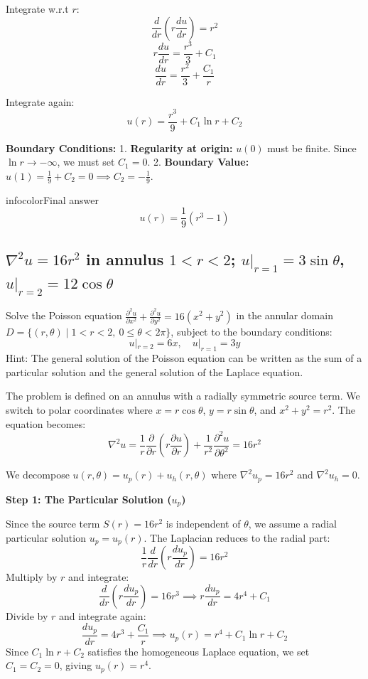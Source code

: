 \documentclass[a4paper,11pt]{article} %
\newenvironment{summarybox}[1][]{\begin{custombox}[#1]{infocolor}{Final answer}}{\end{custombox}}
\begin{document}
Integrate w.r.t $r$:
$$ \frac{d}{dr}\left(r \frac{du}{dr}\right) = r^2 $$
$$ r \frac{du}{dr} = \frac{r^3}{3} + C_1 $$
$$ \frac{du}{dr} = \frac{r^2}{3} + \frac{C_1}{r} $$

Integrate again:
$$ u(r) = \frac{r^3}{9} + C_1 \ln r + C_2 $$

\textbf{Boundary Conditions:}
1. \textbf{Regularity at origin:} $u(0)$ must be finite. Since $\ln r \to -\infty$, we must set $C_1 = 0$.
2. \textbf{Boundary Value:} $u(1) = \tfrac{1}{9} + C_2 = 0 \implies C_2 = -\tfrac{1}{9}$.

\begin{summarybox}
$$ u(r) = \frac{1}{9}(r^3 - 1) $$
\end{summarybox}
\newpage
\subsection{\texorpdfstring{$\nabla^2 u = 16r^2$ in annulus $1<r<2$; $u|_{r=1}=3\sin\theta$, $u|_{r=2}=12\cos\theta$}{Poisson in annulus: particular radial solution $u_p=r^4$ plus homogeneous Laplace for boundary residuals}}

\begin{problembox}
Solve the Poisson equation $\frac{\partial^2 u}{\partial x^2} + \frac{\partial^2 u}{\partial y^2} = 16(x^2 + y^2)$ in the annular domain $D = \{ (r, \theta) \mid 1 < r < 2, \ 0 \le \theta < 2\pi \}$, subject to the boundary conditions:
$$ u|_{r=2} = 6x, \quad u|_{r=1} = 3y $$
Hint: The general solution of the Poisson equation can be written as the sum of a particular solution and the general solution of the Laplace equation.
\end{problembox}

The problem is defined on an annulus with a radially symmetric source term. We switch to polar coordinates where $x = r\cos\theta$, $y = r\sin\theta$, and $x^2+y^2 = r^2$.
The equation becomes:
$$ \nabla^2 u = \frac{1}{r} \frac{\partial}{\partial r} \left( r \frac{\partial u}{\partial r} \right) + \frac{1}{r^2} \frac{\partial^2 u}{\partial \theta^2} = 16r^2 $$

We decompose $u(r,\theta) = u_p(r) + u_h(r,\theta)$ where $\nabla^2 u_p = 16r^2$ and $\nabla^2 u_h = 0$.

\textbf{Step 1: The Particular Solution ($u_p$)}

Since the source term $S(r) = 16r^2$ is independent of $\theta$, we assume a radial particular solution $u_p = u_p(r)$. The Laplacian reduces to the radial part:
$$ \frac{1}{r} \frac{d}{dr} \left( r \frac{du_p}{dr} \right) = 16r^2 $$
Multiply by $r$ and integrate:
$$ \frac{d}{dr} \left( r \frac{du_p}{dr} \right) = 16r^3 \implies r \frac{du_p}{dr} = 4r^4 + C_1 $$
Divide by $r$ and integrate again:
$$ \frac{du_p}{dr} = 4r^3 + \frac{C_1}{r} \implies u_p(r) = r^4 + C_1 \ln r + C_2 $$
Since $C_1 \ln r + C_2$ satisfies the homogeneous Laplace equation, we set $C_1=C_2=0$, giving $u_p(r) = r^4$.
\end{document}
